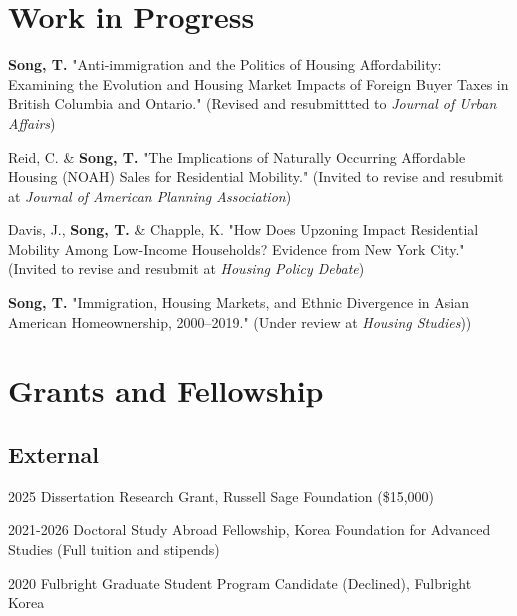 \documentclass[11pt,letterpaper]{report}
\newcommand{\listitemspace}{0.4em}
\renewenvironment{itemize}
{\begin{list}{}{\setlength{\leftmargin}{0.5em}
\setlength{\parskip}{0em}
\setlength{\itemsep}{\listitemspace}
\setlength{\parsep}{\listitemspace}}}
{\end{list}}
\begin{document}
\section*{Work in Progress}
\begin{itemize}
\setlength{\itemsep}{-0.0em}
\item \textbf{Song, T.} "Anti-immigration and the Politics of Housing Affordability: Examining the Evolution and Housing Market Impacts of Foreign Buyer Taxes in British Columbia and Ontario." (Revised and resubmittted to \emph{Journal of Urban Affairs})
\item Reid, C. \& \textbf{Song, T.} "The Implications of Naturally Occurring Affordable Housing (NOAH) Sales for Residential Mobility." (Invited to revise and resubmit at \emph{Journal of American Planning Association})
\item Davis, J., \textbf{Song, T.} \& Chapple, K. "How Does Upzoning Impact Residential Mobility Among Low-Income Households? Evidence from New York City." (Invited to revise and resubmit at \emph{Housing Policy Debate})
\item \textbf{Song, T.} "Immigration, Housing Markets, and Ethnic Divergence in Asian American Homeownership, 2000–2019." (Under review at \emph{Housing Studies}))
\end{itemize}


\section*{Grants and Fellowship}
\subsection*{External}
\begin{tablist}
\item[2025] \tab{}Dissertation Research Grant, Russell Sage Foundation (\$15,000)
\item[2021-2026] \tab{}Doctoral Study Abroad Fellowship, Korea Foundation for Advanced Studies (Full tuition and stipends)
\item[2020] \tab{}Fulbright Graduate Student Program Candidate (Declined), Fulbright Korea
\end{tablist}
\end{document}
